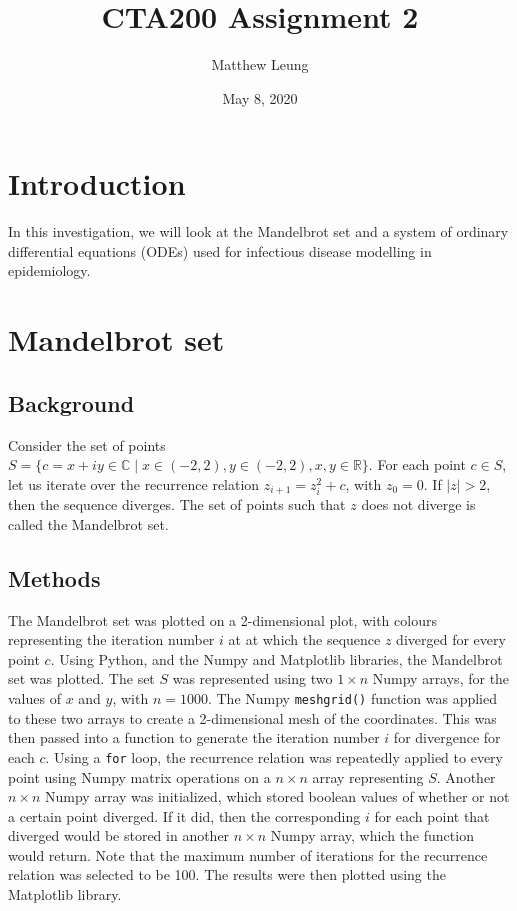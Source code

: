 \documentclass{article}
\title{CTA200 Assignment 2}
\author{Matthew Leung}
\date{May 8, 2020}
\begin{document}
\maketitle

\section{Introduction}

In this investigation, we will look at the Mandelbrot set and a system of ordinary differential equations (ODEs) used for infectious disease modelling in epidemiology.

\section{Mandelbrot set}
\subsection{Background}
Consider the set of points $S=\{c=x+iy \in \mathbb{C} \mid x \in (-2,2), y \in (-2,2), x,y \in \mathbb{R} \}$. For each point $c \in S$, let us iterate over the recurrence relation $z_{i+1} = z_i^2+c$, with $z_0 = 0$. If $|z| > 2$, then the sequence diverges. The set of points such that $z$ does not diverge is called the Mandelbrot set.

\subsection{Methods}
The Mandelbrot set was plotted on a 2-dimensional plot, with colours representing the iteration number $i$ at at which the sequence $z$ diverged for every point $c$. Using Python, and the Numpy and Matplotlib libraries, the Mandelbrot set was plotted. The set $S$ was represented using two $1 \times n$ Numpy arrays, for the values of $x$ and $y$, with $n=1000$. The Numpy  \verb|meshgrid()| function was applied to these two arrays to create a 2-dimensional mesh of the coordinates. This was then passed into a function to generate the iteration number $i$ for divergence for each $c$. Using a \verb|for| loop, the recurrence relation was repeatedly applied to every point using Numpy matrix operations on a $n \times n$ array representing $S$. Another $n \times n$ Numpy array was initialized, which stored boolean values of whether or not a certain point diverged. If it did, then the corresponding $i$ for each point that diverged would be stored in another $n \times n$ Numpy array, which the function would return. Note that the maximum number of iterations for the recurrence relation was selected to be 100. The results were then plotted using the Matplotlib library.
\end{document}
